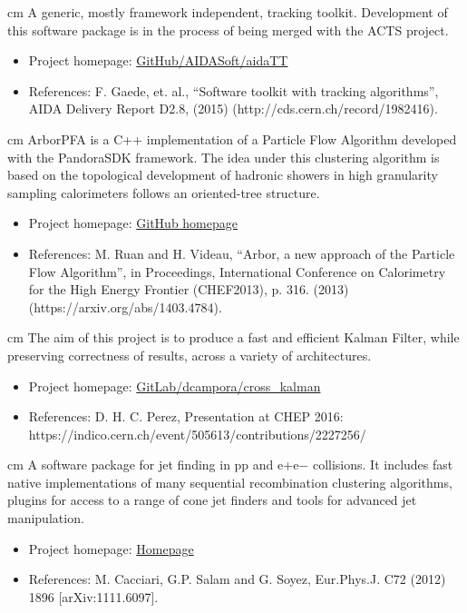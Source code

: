  cm 
A generic, mostly framework independent, tracking toolkit. Development of this software package  is in the process of being merged with the ACTS project.
\begin{itemize}
\item Project homepage: \href{https://github.com/AIDASoft/aidaTT}{GitHub/AIDASoft/aidaTT} 
\item References: F. Gaede, et. al., “Software toolkit with tracking algorithms”, AIDA Delivery Report D2.8, (2015)  (http://cds.cern.ch/record/1982416). 
\end{itemize}

 cm 
ArborPFA is a C++ implementation of a Particle Flow Algorithm developed with the PandoraSDK framework. The idea under this clustering algorithm is based on the topological development of hadronic showers in high granularity sampling calorimeters follows an oriented-tree structure.
\begin{itemize}
\item Project homepage: \href{http://arborpfa.github.io/ArborPFA/}{GitHub homepage} 
\item References: M. Ruan and H. Videau, “Arbor, a new approach of the Particle Flow Algorithm”, in Proceedings, International Conference on Calorimetry for the High Energy Frontier (CHEF2013), p. 316. (2013) (https://arxiv.org/abs/1403.4784).
\end{itemize}

 cm 
The aim of this project is to produce a fast and efficient Kalman Filter, while preserving correctness of results, across a variety of architectures.
\begin{itemize}
\item Project homepage: \href{https://gitlab.cern.ch/dcampora/cross_kalman}{GitLab/dcampora/cross\_kalman} 
\item References: D. H. C. Perez, Presentation at CHEP 2016: https://indico.cern.ch/event/505613/contributions/2227256/ 
\end{itemize}

 cm 
A software package for jet finding in pp and e+e− collisions. It includes fast native implementations of many sequential recombination clustering algorithms, plugins for access to a range of cone jet finders and tools for advanced jet manipulation.
\begin{itemize}
\item Project homepage: \href{http://fastjet.fr/}{Homepage} 
\item References: M. Cacciari, G.P. Salam and G. Soyez, Eur.Phys.J. C72 (2012) 1896 [arXiv:1111.6097].
\end{itemize}

